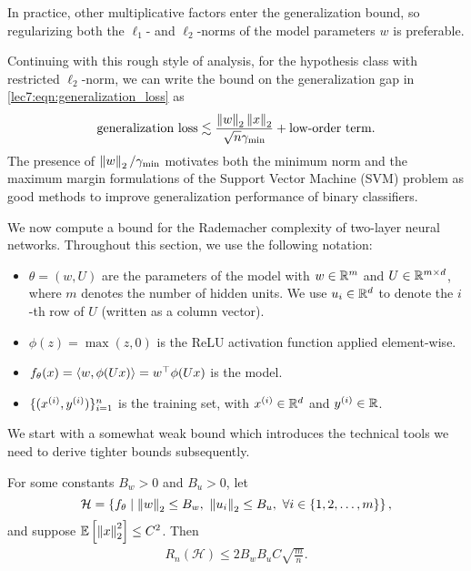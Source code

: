     In practice, other multiplicative factors enter the generalization bound, so regularizing both the $\ell_1$- and $\ell_2$-norms of the model parameters $w$ is preferable.

    Continuing with this rough style of analysis, for the hypothesis class with restricted $\ell_2$-norm, we can write the bound on the generalization gap in \eqref{lec7:eqn:generalization_loss} as
    \begin{equation}
        \text{generalization loss} \lesssim \frac{\Norm{w}_2\Norm{x}_2}{\sqrt{n}\gamma_{\mathrm{min}}} + \text{low-order term}.
    \end{equation}
    The presence of $\Norm{w}_2/\gamma_{\mathrm{min}}$ motivates both the minimum norm and the maximum margin formulations of the Support Vector Machine (SVM) problem as good methods to improve generalization performance of binary classifiers.

We now compute a bound for the Rademacher complexity of two-layer neural networks.  Throughout this section, we use the following notation:
\begin{itemize}
    \item $\theta = (w, U)$ are the parameters of the model with $w \in \R^m$ and $U \in \R^{m \times d}$, where $m$ denotes the number of hidden units. We use $u_i\in\R^d$ to denote the $i$-th row of $U$ (written as a column vector).
    \item $\phi(z) = \max(z, 0)$ is the ReLU activation function applied element-wise.
    \item $f_\theta(x) = \inprod{w,\phi(Ux)} = w^\top \phi(Ux)$ is the model.
    \item $\{ (x\sp{i}, y\sp{i}) \}_{i=1}^n$ is the training set, with $x\sp{i}\in\R^d$ and $y\sp{i}\in\R$.
\end{itemize}
We start with a somewhat weak bound which introduces the technical tools we need to derive tighter bounds subsequently.

\begin{theorem}\label{lec7:thm:thm_3}
    For some constants $B_w > 0$ and $B_u > 0$, let
    \begin{equation}
        \mathcal{H} = \cbr{ f_\theta \mid \Norm{w}_2 \leq B_w,\ \Norm{u_i}_2 \leq B_u,\ \forall i \in \{1,2,\dots,m\} }, \label{lec7:eqn:thm_3}
    \end{equation}
    and suppose $\Exp\sbr{\Norm{x}_2^2} \leq C^2$. Then
    \begin{align}
        R_n(\mathcal{H}) \le 2 B_w B_u C\sqrt{\frac{m}{n}}.
    \end{align}
\end{theorem}


